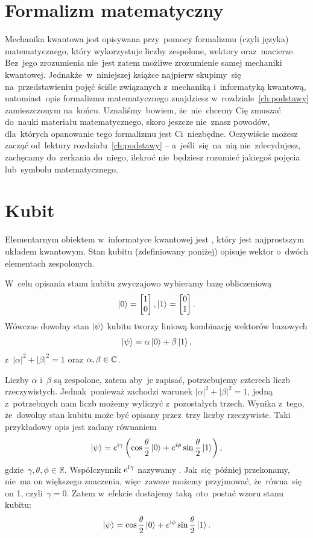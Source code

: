 \section{Formalizm matematyczny}
Mechanika kwantowa jest opisywana przy~pomocy formalizmu (czyli języka)
matematycznego, który wykorzystuje liczby zespolone, wektory oraz~macierze.
Bez~jego zrozumienia nie~jest zatem możliwe zrozumienie samej mechaniki
kwantowej. Jednakże~w~niniejszej książce najpierw skupimy~się na~przedstawieniu
pojęć ściśle związanych z~mechaniką i~informatyką kwantową, natomiast~opis
formalizmu matematycznego znajdziesz w~rozdziale~\ref{ch:podstawy} zamieszczonym na~końcu.
Uznaliśmy~bowiem, że~nie~chcemy Cię zmuszać do~nauki materiału
matematycznego, skoro jeszcze nie~znasz powodów, dla~których opanowanie tego
formalizmu jest Ci~niezbędne. Oczywiście możesz zacząć od~lektury rozdziału~\ref{ch:podstawy} --
a~jeśli~się~na~nią nie~zdecydujesz, zachęcamy do~zerkania do~niego, ilekroć
nie~będziesz rozumieć jakiegoś pojęcia lub~symbolu matematycznego.

\section{Kubit}
Elementarnym obiektem w~informatyce kwantowej jest ,
który jest najprostszym układem kwantowym. Stan kubitu (zdefiniowany poniżej) opisuje wektor o~dwóch
elementach zespolonych.

W~celu opisania stanu kubitu zwyczajowo wybieramy bazę obliczeniową
$$
	\ket{0}=\begin{bmatrix} 1\\ 0\end{bmatrix},
	\ket{1}=\begin{bmatrix} 0\\ 1\end{bmatrix}.
$$
Wówczas dowolny stan $\ket{\psi}$ kubitu tworzy liniową kombinację wektorów bazowych
$$
	\ket{\psi}=\alpha\ket{0}+\beta\ket{1},
	\label{equ:kubit}
$$ z~$|\alpha|^2+|\beta|^2=1$ oraz $\alpha, \beta \in
	\mathbb{C}$.

Liczby $\alpha$ i~$\beta$ są zespolone, zatem aby~je zapisać, potrzebujemy
czterech liczb rzeczywistych. Jednak~ponieważ zachodzi warunek $|\alpha|^2+|\beta|^2=1$,
jedną z~potrzebnych nam liczb możemy wyliczyć z~pozostałych trzech. Wynika z~tego,
że~dowolny stan kubitu może być opisany przez~trzy liczby rzeczywiste.
Taki przykładowy opis jest zadany równaniem
$$
	\ket{\psi}=e^{{\mathrm i}\gamma}\left(
	\cos{\frac{\theta}{2}}\ket{0}+e^{{\mathrm i}\phi}\sin{\frac{\theta}{2}}\ket{1}
	\right),
$$
gdzie~$\gamma, \theta, \phi\in\mathbb{R}$.
Współczynnik $e^{{\mathrm i}\gamma}$ nazywamy . Jak~się~później przekonamy, nie~ma on większego znaczenia, więc~zawsze
możemy przyjmować, że~równa~się on 1, czyli~$\gamma=0$. Zatem w~efekcie
dostajemy taką~oto~postać wzoru stanu kubitu:
$$
	\ket{\psi}=
	\cos{\frac{\theta}{2}}\ket{0}+e^{{\mathrm i}\phi}\sin{\frac{\theta}{2}}\ket{1}.
$$

